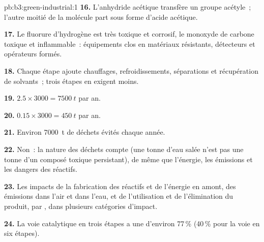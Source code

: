 \begin{solution}{pb:b3:green-industrial:1}
\textbf{16.} L'anhydride acétique transfère un groupe acétyle~; l'autre
moitié de la molécule part sous forme d'acide acétique.

\textbf{17.} Le fluorure d'hydrogène est très toxique et corrosif, le
monoxyde de carbone toxique et inflammable~: équipements clos en matériaux
résistants, détecteurs et opérateurs formés.

\textbf{18.} Chaque étape ajoute chauffages, refroidissements, séparations
et récupération de solvants~; trois étapes en exigent moins.

\textbf{19.} $2.5 \times 3000 = \qty{7500}{t}$ par an.

\textbf{20.} $0.15 \times 3000 = \qty{450}{t}$ par an.

\textbf{21.} Environ \qty{7000}{t} de déchets évités chaque année.

\textbf{22.} Non~: la nature des déchets compte (une tonne d'eau salée n'est
pas une tonne d'un composé toxique persistant), de même que l'énergie, les
émissions et les dangers des réactifs.

\textbf{23.} Les impacts de la fabrication des réactifs et de l'énergie en
amont, des émissions dans l'air et dans l'eau, et de l'utilisation et de
l'élimination du produit, par , dans plusieurs
catégories d'impact.

\textbf{24.} La voie catalytique en trois étapes a une  d'environ 77\,\% (40\,\% pour la
voie en six étapes).
\end{solution}
